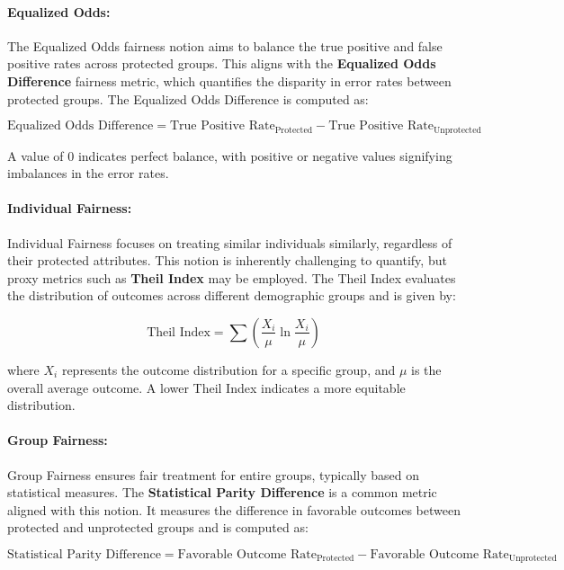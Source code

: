 \paragraph{Equalized Odds:}

The Equalized Odds fairness notion aims to balance the true positive and false positive rates across protected groups. This aligns with the \textbf{Equalized Odds Difference} fairness metric, which quantifies the disparity in error rates between protected groups. The Equalized Odds Difference is computed as:

\[
\text{Equalized Odds Difference} = \text{True Positive Rate}_{\text{Protected}} - \text{True Positive Rate}_{\text{Unprotected}}
\]

A value of 0 indicates perfect balance, with positive or negative values signifying imbalances in the error rates.

\paragraph{Individual Fairness:}

Individual Fairness focuses on treating similar individuals similarly, regardless of their protected attributes. This notion is inherently challenging to quantify, but proxy metrics such as \textbf{Theil Index} may be employed. The Theil Index evaluates the distribution of outcomes across different demographic groups and is given by:

\[
\text{Theil Index} = \sum \left( \frac{X_{i}}{\mu} \ln \frac{X_{i}}{\mu} \right)
\]

where \(X_{i}\) represents the outcome distribution for a specific group, and \(\mu\) is the overall average outcome. A lower Theil Index indicates a more equitable distribution.

\paragraph{Group Fairness:}

Group Fairness ensures fair treatment for entire groups, typically based on statistical measures. The \textbf{Statistical Parity Difference} is a common metric aligned with this notion. It measures the difference in favorable outcomes between protected and unprotected groups and is computed as:

\[
\text{Statistical Parity Difference} = \text{Favorable Outcome Rate}_{\text{Protected}} - \text{Favorable Outcome Rate}_{\text{Unprotected}}
\]


